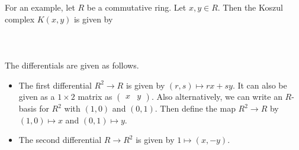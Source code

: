\documentclass[a4paper]{article}
\begin{document}
For an example, let $R$ be a commutative ring. Let $x,y\in R$. Then the Koszul complex $K(x,y)$ is given by \\~\\
\\~\\
The differentials are given as follows. 
\begin{itemize}
\item The first differential $R^2\to R$ is given by $(r,s)\mapsto rx+sy$. It can also be given as a $1\times 2$ matrix as $\begin{pmatrix}x & y\end{pmatrix}$. Also alternatively, we can write an $R$-basis for $R^2$ with $(1,0)$ and $(0,1)$. Then define the map $R^2\to R$ by $(1,0)\mapsto x$ and $(0,1)\mapsto y$. 
\item The second differential $R\to R^2$ is given by $1\mapsto(x,-y)$. 
\end{itemize}
\end{document}
